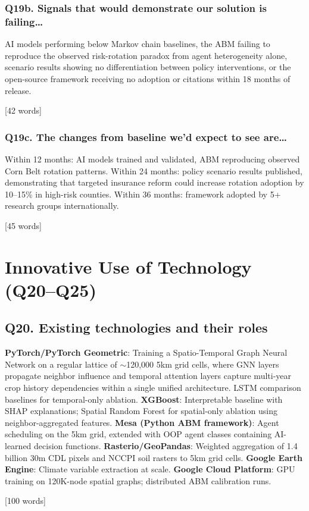 \documentclass[11pt,letterpaper]{article}
\newcommand{\answer}[1]{%
    \vspace{0.2em}%
    \noindent\colorbox{answerbox}{\parbox{\dimexpr\textwidth-2\fboxsep}{%
        \vspace{0.4em}#1\vspace{0.4em}%
    }}%
    \vspace{0.5em}%
}
\newcommand{\wordcount}[1]{%
    \hfill{\scriptsize\textcolor{notegray}{[#1 words]}}%
}
\begin{document}
\subsubsection{Q19b. Signals that would demonstrate our solution is failing\ldots}
\answer{AI models performing below Markov chain baselines, the ABM failing to reproduce the observed risk-rotation paradox from agent heterogeneity alone, scenario results showing no differentiation between policy interventions, or the open-source framework receiving no adoption or citations within 18 months of release.}
\wordcount{42}

\subsubsection{Q19c. The changes from baseline we'd expect to see are\ldots}
\answer{Within 12 months: AI models trained and validated, ABM reproducing observed Corn Belt rotation patterns. Within 24 months: policy scenario results published, demonstrating that targeted insurance reform could increase rotation adoption by 10--15\% in high-risk counties. Within 36 months: framework adopted by 5+ research groups internationally.}
\wordcount{45}

\section{Innovative Use of Technology (Q20--Q25)}

\subsection{Q20. Existing technologies and their roles}
\answer{\textbf{PyTorch/PyTorch Geometric}: Training a Spatio-Temporal Graph Neural Network on a regular lattice of ${\sim}$120,000 5km grid cells, where GNN layers propagate neighbor influence and temporal attention layers capture multi-year crop history dependencies within a single unified architecture. LSTM comparison baselines for temporal-only ablation. \textbf{XGBoost}: Interpretable baseline with SHAP explanations; Spatial Random Forest for spatial-only ablation using neighbor-aggregated features. \textbf{Mesa (Python ABM framework)}: Agent scheduling on the 5km grid, extended with OOP agent classes containing AI-learned decision functions. \textbf{Rasterio/GeoPandas}: Weighted aggregation of 1.4 billion 30m CDL pixels and NCCPI soil rasters to 5km grid cells. \textbf{Google Earth Engine}: Climate variable extraction at scale. \textbf{Google Cloud Platform}: GPU training on 120K-node spatial graphs; distributed ABM calibration runs.}
\wordcount{100}
\end{document}
